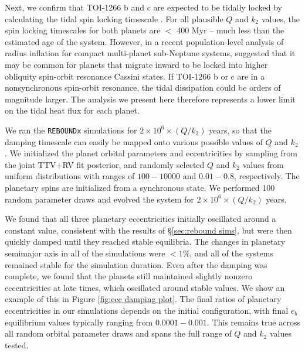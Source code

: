\documentclass[twocolumn]{aastex631}
\begin{document}
Next, we confirm that TOI-1266 b and c are expected to be tidally locked by calculating the tidal spin locking timescale \citep{Gladman1996}. For all plausible $Q$ and $k_2$ values, the spin locking timescales for both planets are $<$ 400 Myr -- much less than the estimated age of the system. However, in a recent population-level analysis of radius inflation for compact multi-planet sub-Neptune systems, \cite{Millholland2024} suggested that it may be common for planets that migrate inward to be locked into higher obliquity spin-orbit resonance Cassini states. If TOI-1266 b or c are in a nonsynchronous spin-orbit resonance, the tidal dissipation could be orders of magnitude larger. The analysis we present here therefore represents a lower limit on the tidal heat flux for each planet.

We ran the \texttt{REBOUNDx} simulations for $2\times10^6\times(Q/k_2)$ years, so that the damping timescale can easily be mapped onto various possible values of $Q$ and $k_2$. We initialized the planet orbital parameters and eccentricities by sampling from the joint TTV+RV fit posterior, and randomly selected $Q$ and $k_2$ values from uniform distributions with ranges of $100 - 10000$ and $0.01 - 0.8$, respectively. The planetary spins are initialized from a synchronous state. We performed 100 random parameter draws and evolved the system for $2\times10^6\times(Q/k_2)$ years. 

We found that all three planetary eccentricities initially oscillated around a constant value, consistent with the results of \S\ref{sec:rebound sims}, but were then quickly damped until they reached stable equilibria. The changes in planetary semimajor axis in all of the simulations were $< 1\%$, and all of the systems remained stable for the simulation duration. Even after the damping was complete, we found that the planets still maintained slightly nonzero eccentricities at late times, which oscillated around stable values. We show an example of this in Figure \ref{fig:ecc damping plot}. The final ratios of planetary eccentricities in our simulations depends on the initial configuration, with final $e_b$ equilibrium values typically ranging from $0.0001 - 0.001$. This remains true across all random orbital parameter draws and spans the full range of $Q$ and $k_2$ values tested.
\end{document}
